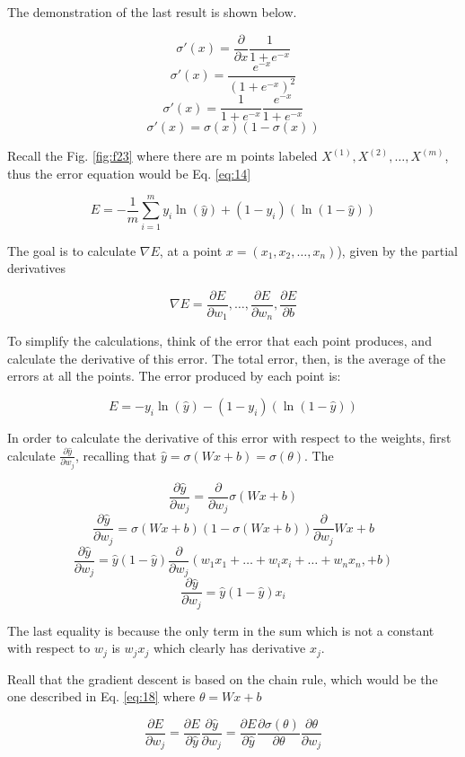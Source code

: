 \documentclass{article}
\begin{document}
The demonstration of the last result is shown below.

\[\sigma'(x) = \frac{\partial}{\partial x} \frac{1}{1 + e ^{-x}}\]
\[\sigma'(x) = \frac{e ^{-x}}{(1 + e ^{-x})^2}\]
\[\sigma'(x) = \frac{1}{1 + e ^{-x}} \frac{e ^{-x}}{1 + e ^{-x}}\]
\[\sigma'(x) = \sigma(x)(1 - \sigma(x)) \]

Recall the Fig. \ref{fig:f23} where there are m points labeled \(X^{(1)}, X^{(2)}, \dots, X^{(m)} \), thus the error equation would be Eq. \eqref{eq:14}

\[E = - \frac{1}{m} \sum_{i=1}^m y_i\ln{(\hat{y})} + (1 - y_i) (\ln{(1 - \hat{y})})\]

The goal is to calculate \(\nabla E\), at a point \(x = (x_1, x_2,\dots,x_n)\)), given by the partial derivatives

\[\nabla E = \frac{\partial E}{\partial w_1}, \dots, \frac{\partial E}{\partial w_n}, \frac{\partial E}{\partial b}\]

To simplify the calculations, think of the error that each point produces, and calculate the derivative of this error. The total error, then, is the average of the errors at all the points. The error produced by each point is:

\[ E = -y_i\ln{(\hat{y})} - (1 - y_i) (\ln{(1 - \hat{y})})\]

In order to calculate the derivative of this error with respect to the weights, first calculate \(\frac{\partial \hat{y}}{\partial w_j}\), recalling that \(\hat{y} = \sigma(Wx + b) = \sigma(\theta)\). The 

\[\frac{\partial \hat{y}}{\partial w_j} = \frac{\partial}{\partial w_j} \sigma(Wx + b) \]
\[\frac{\partial \hat{y}}{\partial w_j} = \sigma(Wx + b)(1 - \sigma(Wx + b)) \frac{\partial}{\partial w_j}Wx + b \]
\[\frac{\partial \hat{y}}{\partial w_j} = \hat{y}(1 - \hat{y}) \frac{\partial}{\partial w_j}(w_1x_1+\dots+w_ix_i+\dots+w_nx_n, + b) \]
\[\frac{\partial \hat{y}}{\partial w_j} = \hat{y}(1 - \hat{y}) x_i \]

The last equality is because the only term in the sum which is not a constant with respect to \(w_j\) is \( w_jx_j\) which clearly has derivative \(x_j\).

Reall that the gradient descent is based on the chain rule, which would be the one described in Eq. \eqref{eq:18} where \(\theta = Wx + b\)

\begin{equation}
\label{eq:18}
\frac{\partial E}{\partial w_j} = \frac{\partial E}{\partial \hat{y}} \frac{\partial \hat{y}}{\partial w_j} =  \frac{\partial E}{\partial \hat{y}} \frac{\partial \sigma(\theta)}{\partial \theta} \frac{\partial \theta}{\partial w_j}
\end{equation} 
\end{document}
